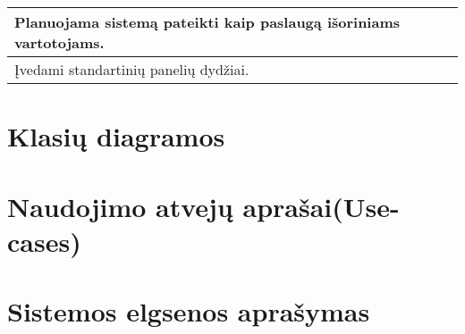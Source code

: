 \documentclass[a4paper,12pt]{article}
\begin{document}
\begin{frame}
\begin{tabular}{|l|c|}
Planuojama sistemą pateikti kaip paslaugą išoriniams vartotojams.                                                                                                                                                                                                                                                                                         &                       \\ \hline
Įvedami standartinių panelių dydžiai.                                                                                                                                                                                                                                                                                                                     &                       \\ \hline
\end{tabular}
\end{frame}


\section{Klasių diagramos}

\section{Naudojimo atvejų aprašai(Use-cases)}





\section{Sistemos elgsenos aprašymas}
\end{document}
